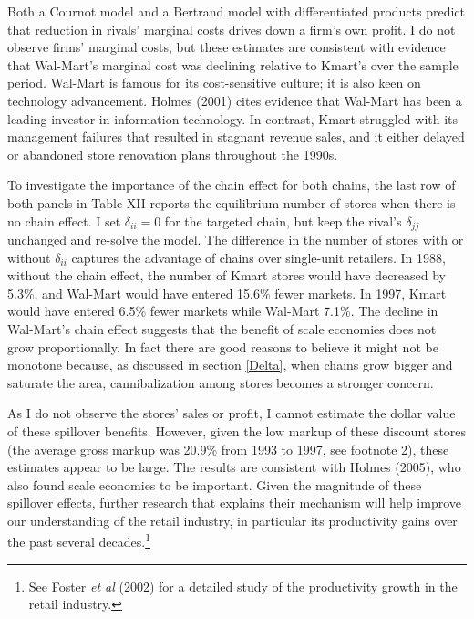 \documentclass[notitlepage,onecolumn,11pt]{article}
\begin{document}
Both a Cournot model and a Bertrand model with differentiated products
predict that reduction in rivals' marginal costs drives down a firm's own
profit. I do not observe firms' marginal costs, but these estimates are
consistent with evidence that Wal-Mart's marginal cost was declining
relative to Kmart's over the sample period. Wal-Mart is famous for its
cost-sensitive culture; it is also keen on technology advancement. Holmes
(2001) cites evidence that Wal-Mart has been a leading investor in
information technology. In contrast, Kmart struggled with its management
failures that resulted in stagnant revenue sales, and it either delayed or
abandoned store renovation plans throughout the 1990s.

To investigate the importance of the chain effect for both chains, the last
row of both panels in Table XII reports the equilibrium number of stores
when there is no chain effect. I set $\delta _{ii}=0$ for the targeted
chain, but keep the rival's $\delta _{jj}$ unchanged and re-solve the model.
The difference in the number of stores with or without $\delta _{ii}$
captures the advantage of chains over single-unit retailers. In 1988,
without the chain effect, the number of Kmart stores would have decreased by
5.3\%, and Wal-Mart would have entered 15.6\% fewer markets. In 1997, Kmart
would have entered 6.5\% fewer markets while Wal-Mart 7.1\%. The decline in
Wal-Mart's chain effect suggests that the benefit of scale economies does
not grow proportionally. In fact there are good reasons to believe it might
not be monotone because, as discussed in section \ref{Delta}, when chains
grow bigger and saturate the area, cannibalization among stores becomes a
stronger concern.

As I do not observe the stores' sales or profit, I cannot estimate the
dollar value of these spillover benefits. However, given the low markup of
these discount stores (the average gross markup was 20.9\% from 1993 to
1997, see footnote 2), these estimates appear to be large. The results are
consistent with Holmes (2005), who also found scale economies to be
important. Given the magnitude of these spillover effects, further research
that explains their mechanism will help improve our understanding of the
retail industry, in particular its productivity gains over the past several
decades.\footnote{%
See Foster \textit{et al} (2002) for a detailed study of the productivity
growth in the retail industry.}
\end{document}
